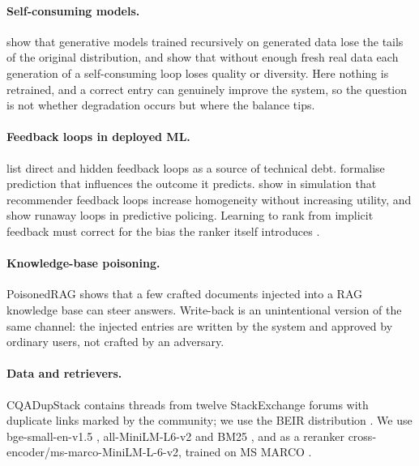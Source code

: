 \documentclass[11pt]{article}
\begin{document}
\paragraph{Self-consuming models.} \citet{shumailov2024collapse} show that generative models trained recursively on generated data lose the tails of the original distribution, and \citet{alemohammad2024mad} show that without enough fresh real data each generation of a self-consuming loop loses quality or diversity. Here nothing is retrained, and a correct entry can genuinely improve the system, so the question is not whether degradation occurs but where the balance tips.

\paragraph{Feedback loops in deployed ML.} \citet{sculley2015debt} list direct and hidden feedback loops as a source of technical debt. \citet{perdomo2020performative} formalise prediction that influences the outcome it predicts. \citet{chaney2018confounding} show in simulation that recommender feedback loops increase homogeneity without increasing utility, and \citet{ensign2018runaway} show runaway loops in predictive policing. Learning to rank from implicit feedback must correct for the bias the ranker itself introduces \citep{joachims2017unbiased}.

\paragraph{Knowledge-base poisoning.} PoisonedRAG \citep{zou2025poisonedrag} shows that a few crafted documents injected into a RAG knowledge base can steer answers. Write-back is an unintentional version of the same channel: the injected entries are written by the system and approved by ordinary users, not crafted by an adversary.

\paragraph{Data and retrievers.} CQADupStack \citep{hoogeveen2015cqadupstack} contains threads from twelve StackExchange forums with duplicate links marked by the community; we use the BEIR distribution \citep{thakur2021beir}. We use bge-small-en-v1.5 \citep{xiao2024cpack}, all-MiniLM-L6-v2 \citep{reimers2019sbert,wang2020minilm} and BM25 \citep{robertson2009bm25}, and as a reranker cross-encoder/ms-marco-MiniLM-L-6-v2, trained on MS MARCO \citep{nguyen2016msmarco}.
\end{document}
